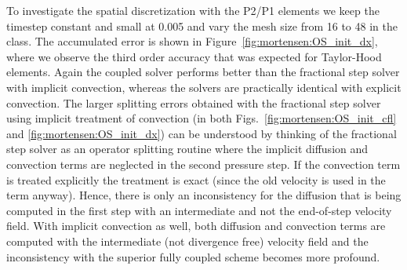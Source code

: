 To investigate the spatial discretization with the P2/P1 elements we keep the timestep constant and small at 0.005 and vary the mesh size from 16 to 48 in the  class. The accumulated error is shown in Figure~\ref{fig:mortensen:OS_init_dx}, where we observe the third order accuracy that was expected for Taylor-Hood elements. Again the coupled solver performs better than the fractional step solver with implicit convection, whereas the solvers are practically identical with explicit convection. The larger splitting errors obtained with the fractional step solver using implicit treatment of convection (in both Figs.~\ref{fig:mortensen:OS_init_cfl} and \ref{fig:mortensen:OS_init_dx}) can be understood by thinking of the fractional step solver as an operator splitting routine where the implicit diffusion and convection terms are neglected in the second pressure step. If the convection term is treated explicitly the treatment is exact (since the old velocity is used in the term anyway). Hence, there is only an inconsistency for the diffusion that is being computed in the first step with an intermediate and not the end-of-step velocity field. With implicit convection as well, both diffusion and convection terms are computed with the intermediate (not divergence free) velocity field and the inconsistency with the superior fully coupled scheme becomes more profound.

